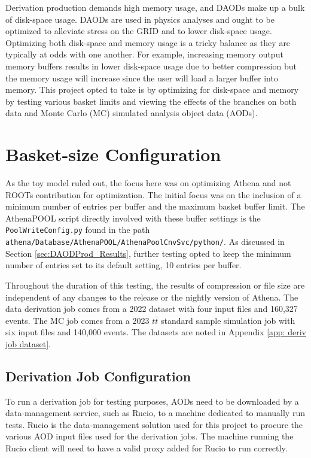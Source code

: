 Derivation production demands high memory usage, and DAODs make up a bulk of disk-space usage. 
DAODs are used in physics analyses and ought to be optimized to alleviate stress on the GRID and to lower disk-space usage. 
Optimizing both disk-space and memory usage is a tricky balance as they are typically at odds with one another. 
For example, increasing memory output memory buffers results in lower disk-space usage due to better compression but the memory usage will increase since the user will load a larger buffer into memory. 
This project opted to take is by optimizing for disk-space and memory by testing various basket limits and viewing the effects of the branches on both data and Monte Carlo (MC) simulated analysis object data (AODs).

\section{Basket-size Configuration}
\label{sec:DAODProd_Analysis}

As the toy model ruled out, the focus here was on optimizing Athena and not ROOTs contribution for optimization.
The initial focus was on the inclusion of a minimum number of entries per buffer and the maximum basket buffer limit.
The AthenaPOOL script directly involved with these buffer settings is the \verb|PoolWriteConfig.py| found in the path \verb|athena/Database/AthenaPOOL/AthenaPoolCnvSvc/python/|.
As discussed in Section \ref{sec:DAODProd_Results}, further testing opted to keep the minimum number of entries set to its default setting, 10 entries per buffer. 

Throughout the duration of this testing, the results of compression or file size are independent of any changes to the release or the nightly version of Athena.  
The data derivation job comes from a 2022 dataset with four input files and 160,327 events. 
The MC job comes from a 2023 $t\bar{t}$ standard sample simulation job with six input files and 140,000 events. 
The datasets are noted in Appendix \ref{app: deriv job dataset}.

\subsection{Derivation Job Configuration}
To run a derivation job for testing purposes, AODs need to be downloaded by a data-management service, such as Rucio, to a machine dedicated to manually run tests.\cite{RUCIO_citation} 
Rucio is the data-management solution used for this project to procure the various AOD input files used for the derivation jobs.
The machine running the Rucio client will need to have a valid proxy added for Rucio to run correctly.  

